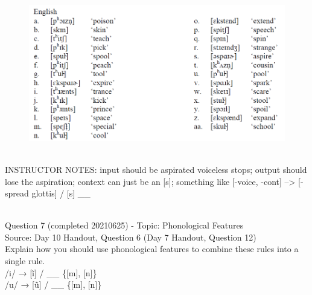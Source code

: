 \documentclass[12pt]{article}
\begin{document}
\begin{figure}[H]
\includegraphics{../images/english_asp.png}
\end{figure}

~\\
INSTRUCTOR NOTES: input should be aspirated voiceless stops; output should lose the aspiration; context can just be an [s]; something like [-voice, -cont] --> [-spread glottis] / [s] \_\_


~\\

{\large Question 7} (completed 20210625) - Topic: Phonological Features\\
Source: Day 10 Handout, Question 6 (Day 7 Handout, Question 12)\\

Explain how you should use phonological features to combine these rules into a single rule.\\

/i/ → {[ĩ]} / \_\_ \{{[m]}, {[n]}\}\\/u/ → {[ũ]} / \_\_ \{{[m]}, {[n]}\}
\end{document}
